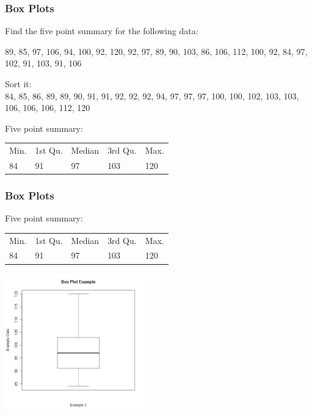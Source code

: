 \begin{frame}
  \frametitle{Box Plots}


  Find the five point summary for the following data:

    89, 85, 97, 106, 94, 100, 92, 120, 92, 97, 89, 90, 103, 86, 106, 112, 100, 92, 84,
    97, 102, 91, 103, 91, 106

    \vfill

  {
    Sort it: \\
    84, 85, 86, 89, 89, 90, 91, 91, 92, 92, 92, 94, 97, 97, 97, 100,
    100, 102, 103, 103, 106, 106, 106, 112, 120

  }

    \vfill

    {
    Five point summary: \\
    \begin{tabular}{lllll}
     Min. & 1st Qu. & Median    & 3rd Qu. &   Max. \\
     84   & 91      & 97        & 103     & 120
    \end{tabular}


  }

  \vfill

\end{frame}


\begin{frame}
  \frametitle{Box Plots}

    Five point summary: \\
    \begin{tabular}{lllll}
     Min. & 1st Qu. & Median    & 3rd Qu. &   Max. \\
     84   & 91      & 97        & 103     & 120
    \end{tabular}

    \begin{center}
      \includegraphics[width=6cm]{img/boxplotExample1}
    \end{center}

\end{frame}



